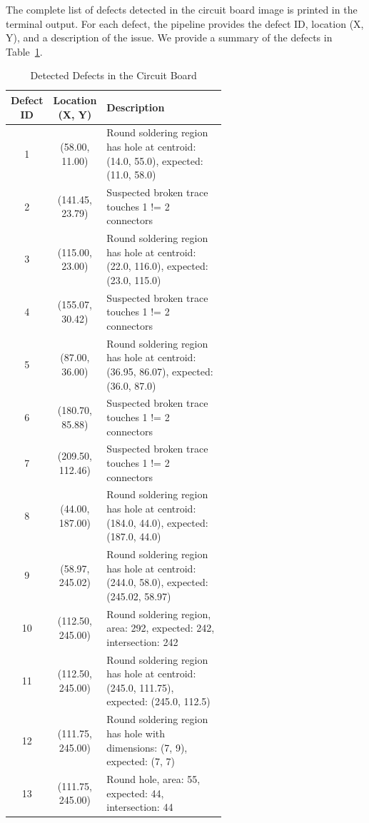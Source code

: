 \documentclass[a4paper,12pt]{article}
\begin{document}
The complete list of defects detected in the circuit board image is printed in the terminal output. For each defect, the pipeline provides the defect ID, location (X, Y), and a description of the issue. We provide a summary of the defects in Table~\ref{tab:defects}.

\begin{table}[!htbp]
    \centering
    \caption{Detected Defects in the Circuit Board}
    \label{tab:defects}
    \begin{tabular}{|c|c|p{0.6\linewidth}|}
        \hline
        \textbf{Defect ID} & \textbf{Location (X, Y)} & \textbf{Description} \\
        \hline
        1 & (58.00, 11.00) & Round soldering region has hole at centroid: (14.0, 55.0), expected: (11.0, 58.0) \\
        2 & (141.45, 23.79) & Suspected broken trace touches 1 != 2 connectors \\
        3 & (115.00, 23.00) & Round soldering region has hole at centroid: (22.0, 116.0), expected: (23.0, 115.0) \\
        4 & (155.07, 30.42) & Suspected broken trace touches 1 != 2 connectors \\
        5 & (87.00, 36.00) & Round soldering region has hole at centroid: (36.95, 86.07), expected: (36.0, 87.0) \\
        6 & (180.70, 85.88) & Suspected broken trace touches 1 != 2 connectors \\
        7 & (209.50, 112.46) & Suspected broken trace touches 1 != 2 connectors \\
        8 & (44.00, 187.00) & Round soldering region has hole at centroid: (184.0, 44.0), expected: (187.0, 44.0) \\
        9 & (58.97, 245.02) & Round soldering region has hole at centroid: (244.0, 58.0), expected: (245.02, 58.97) \\
        10 & (112.50, 245.00) & Round soldering region, area: 292, expected: 242, intersection: 242 \\
        11 & (112.50, 245.00) & Round soldering region has hole at centroid: (245.0, 111.75), expected: (245.0, 112.5) \\
        12 & (111.75, 245.00) & Round soldering region has hole with dimensions: (7, 9), expected: (7, 7) \\
        13 & (111.75, 245.00) & Round hole, area: 55, expected: 44, intersection: 44 \\
        \hline
    \end{tabular}
\end{table}
\end{document}
